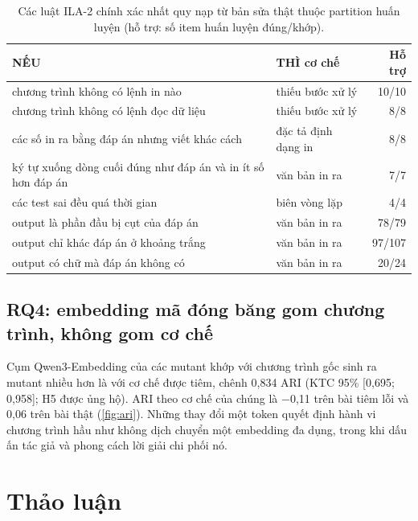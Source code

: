 \documentclass[a4paper,preprint,12pt,authoryear]{elsarticle}
\begin{document}
\begin{table}[t]
\centering
\caption{Các luật ILA-2 chính xác nhất quy nạp từ bản sửa thật thuộc partition huấn luyện (hỗ trợ: số item huấn luyện đúng/khớp).}\label{tab:toprules}
\small
\begin{tabular}{p{7.6cm}p{3.0cm}r}
\toprule
NẾU & THÌ cơ chế & Hỗ trợ \\
\midrule
chương trình không có lệnh in nào & thiếu bước xử lý & 10/10 \\
chương trình không có lệnh đọc dữ liệu & thiếu bước xử lý & 8/8 \\
các số in ra bằng đáp án nhưng viết khác cách & đặc tả định dạng in & 8/8 \\
ký tự xuống dòng cuối đúng như đáp án và in ít số hơn đáp án & văn bản in ra & 7/7 \\
các test sai đều quá thời gian & biên vòng lặp & 4/4 \\
output là phần đầu bị cụt của đáp án & văn bản in ra & 78/79 \\
output chỉ khác đáp án ở khoảng trắng & văn bản in ra & 97/107 \\
output có chữ mà đáp án không có & văn bản in ra & 20/24 \\
\bottomrule
\end{tabular}
\end{table}

\subsection{RQ4: embedding mã đóng băng gom chương trình, không gom cơ chế}
Cụm Qwen3-Embedding của các mutant khớp với chương trình gốc sinh ra mutant nhiều hơn là với cơ chế được tiêm, chênh 0,834 ARI (KTC 95\% [0,695; 0,958]; H5 được ủng hộ). ARI theo cơ chế của chúng là $-$0,11 trên bài tiêm lỗi và 0,06 trên bài thật (\cref{fig:ari}). Những thay đổi một token quyết định hành vi chương trình hầu như không dịch chuyển một embedding đa dụng, trong khi dấu ấn tác giả và phong cách lời giải chi phối nó.

\section{Thảo luận}\label{sec:discussion}
\end{document}
